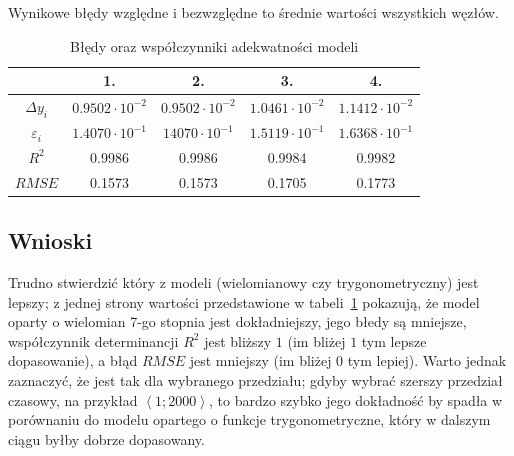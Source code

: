 \documentclass[a4paper, 12pt]{mwart}
\begin{document}
				Wynikowe błędy względne i bezwzględne to średnie wartości wszystkich węzłów.
				\vspace{8pt}
				\begin{table}[h]
					\centering
					\begin{tabular}{c|c|c|c|c|}
						\cline{2-5}
						\cellcolor[HTML]{FFFFFF}              & 1.                     & 2.                     & 3.                     & 4.                     \\ \hline
						\multicolumn{1}{|c|}{$\Delta y_i$}    & $0.9502 \cdot 10^{-2}$ & $0.9502 \cdot 10^{-2}$ & $1.0461 \cdot 10^{-2}$ & $1.1412 \cdot 10^{-2}$ \\ \hline
						\multicolumn{1}{|c|}{$\varepsilon_i$} & $1.4070 \cdot 10^{-1}$ & $14070 \cdot 10^{-1}$ & $1.5119\cdot 10^{-1}$  & $1.6368 \cdot 10^{-1}$ \\ \hline
						\multicolumn{1}{|c|}{$R^2$}           & 0.9986                 & 0.9986                 & 0.9984                 & 0.9982                 \\ \hline
						\multicolumn{1}{|c|}{$RMSE$}          & 0.1573                 & 0.1573                 & 0.1705                 & 0.1773                 \\ \hline
					\end{tabular}
					\caption{Błędy oraz współczynniki adekwatności modeli}
					\label{tab:err}
				\end{table}

		\newpage				

		\subsection{Wnioski}

		Trudno stwierdzić który z modeli (wielomianowy czy  trygonometryczny) jest lepszy;
		z jednej strony wartości przedstawione
		w tabeli~\ref{tab:err} pokazują, że model oparty o wielomian 7-go stopnia jest dokładniejszy,
		jego błedy są mniejsze, współczynnik determinancji $R^2$ jest bliższy $1$ (im bliżej 
		$1$ tym lepsze dopasowanie), a błąd $RMSE$ jest mniejszy (im bliżej $0$ tym lepiej).
		Warto jednak zaznaczyć, że jest tak dla wybranego przedziału; gdyby wybrać szerszy przedział
		czasowy, na przykład $\left\langle 1; 2000 \right\rangle$, to bardzo szybko jego dokładność
		by spadła w porównaniu do modelu opartego o funkcje trygonometryczne, który w dalszym ciągu
		byłby dobrze dopasowany.
\end{document}
